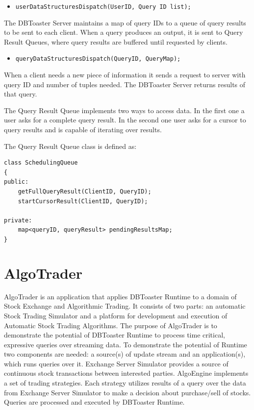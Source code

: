 \documentclass[14pt]{article}
\begin{document}
\begin{itemize}
\item {\tt userDataStructuresDispatch(UserID, Query ID list);}
\end{itemize}

\noindent The DBToaster Server maintains a map of query IDs to a queue of query
results to be sent to each client. When a query produces an output, it is sent
to Query Result Queues, where query results are buffered until requested by
clients.

\begin{itemize}
\item {\tt queryDataStructuresDispatch(QueryID, QueryMap);}
\end{itemize}

\noindent When a client needs a new piece of information it sends a request to
server with query ID and number of tuples needed.  The DBToaster Server returns
results of that query.

The Query Result Queue implements two ways to access data. In the first one a user
asks for a complete query result. In the second one user asks for a cursor to
query results and is capable of iterating over results.

The Query Result Queue class is defined as:

\begin{Verbatim}
class SchedulingQueue
{
public:
    getFullQueryResult(ClientID, QueryID);
    startCursorResult(ClientID, QueryID);

private:
    map<queryID, queryResult> pendingResultsMap;
}
\end{Verbatim}








\section{AlgoTrader}

AlgoTrader is an application that applies DBToaster Runtime to a domain of Stock
Exchange and Algorithmic Trading. It consists of two parts: an automatic Stock
Trading Simulator and a platform for development and execution of Automatic
Stock Trading Algorithms. The purpose of AlgoTrader is to demonstrate the
potential of DBToaster Runtime to process time critical, expressive queries over
streaming data. To demonstrate the potential of Runtime two components are
needed: a source(s) of update stream and an application(s), which runs queries
over it. Exchange Server Simulator provides a source of continuous stock
transactions between interested parties. AlgoEngine implements a set of trading
strategies. Each strategy utilizes results of a query over the data from
Exchange Server Simulator to make a decision about purchase/sell of
stocks. Queries are processed and executed by DBToaster Runtime.
  
\end{document}
